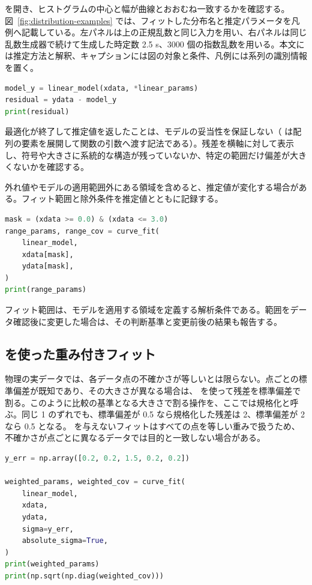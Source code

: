  を開き、ヒストグラムの中心と幅が曲線とおおむね一致するかを確認する。図~\ref{fig:distribution-examples} では、フィットした分布名と推定パラメータを凡例へ記載している。左パネルは上の正規乱数と同じ入力を用い、右パネルは同じ乱数生成器で続けて生成した時定数 2.5 s、3000 個の指数乱数を用いる。本文には推定方法と解釈、キャプションには図の対象と条件、凡例には系列の識別情報を置く。

\begin{lstlisting}[language=Python]
model_y = linear_model(xdata, *linear_params)
residual = ydata - model_y
print(residual)
\end{lstlisting}

最適化が終了して推定値を返したことは、モデルの妥当性を保証しない（ は配列の要素を展開して関数の引数へ渡す記法である）。残差を横軸に対して表示し、符号や大きさに系統的な構造が残っていないか、特定の範囲だけ偏差が大きくないかを確認する。

外れ値やモデルの適用範囲外にある領域を含めると、推定値が変化する場合がある。フィット範囲と除外条件を推定値とともに記録する。

\begin{lstlisting}[language=Python]
mask = (xdata >= 0.0) & (xdata <= 3.0)
range_params, range_cov = curve_fit(
    linear_model,
    xdata[mask],
    ydata[mask],
)
print(range_params)
\end{lstlisting}

フィット範囲は、モデルを適用する領域を定義する解析条件である。範囲をデータ確認後に変更した場合は、その判断基準と変更前後の結果も報告する。

\subsection{ を使った重み付きフィット}

物理の実データでは、各データ点の不確かさが等しいとは限らない。点ごとの標準偏差が既知であり、その大きさが異なる場合は、 を使って残差を標準偏差で割る。このように比較の基準となる大きさで割る操作を、ここでは規格化と呼ぶ。同じ 1 のずれでも、標準偏差が 0.5 なら規格化した残差は 2、標準偏差が 2 なら 0.5 となる。 を与えないフィットはすべての点を等しい重みで扱うため、不確かさが点ごとに異なるデータでは目的と一致しない場合がある。

\begin{lstlisting}[language=Python]
y_err = np.array([0.2, 0.2, 1.5, 0.2, 0.2])

weighted_params, weighted_cov = curve_fit(
    linear_model,
    xdata,
    ydata,
    sigma=y_err,
    absolute_sigma=True,
)
print(weighted_params)
print(np.sqrt(np.diag(weighted_cov)))
\end{lstlisting}

